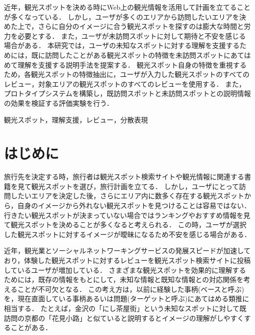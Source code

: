 \documentclass{deimj}
\begin{document}
\pagestyle{empty}
\begin{jabstract}
近年，観光スポットを決める時にWeb上の観光情報を活用して計画を立てることが多くなっている．
しかし，ユーザが多くのエリアから訪問したいエリアを決めた上で，さらに自分のイメージに合う観光スポットを探すのは膨大な時間と労力を必要とする．
また，ユーザが未訪問スポットに対して期待と不安を感じる場合がある．
本研究では，ユーザの未知なスポットに対する理解を支援するためには，既に訪問したことがある観光スポットの特徴を未訪問スポットにあてはめて理解を支援する説明手法を提案する．
観光スポット自身の特徴を重視するため，各観光スポットの特徴抽出に，ユーザが入力した観光スポットのすべてのレビュー，対象エリアの観光スポットのすべてのレビューを使用する．
また，プロトタイプシステムを構築し，既訪問スポットと未訪問スポットとの説明情報の効果を検証する評価実験を行う．
\end{jabstract}

\begin{jkeyword}
観光スポット，理解支援，レビュー，分散表現
\end{jkeyword}
\maketitle


\section{はじめに}
\label{sec:はじめに}
旅行先を決定する時，旅行者は観光スポット検索サイトや観光情報に関連する書籍を見て観光スポットを選び，旅行計画を立てる．
しかし，ユーザにとって訪問したいエリアを決定した後，さらにエリア内に数多く存在する観光スポットから，自身のイメージから外れない観光スポットを見つけることは容易ではない．
行きたい観光スポットが決まっていない場合ではランキングやおすすめ情報を見て観光スポットを決めることが多くなると考えられる．
この時，ユーザが選択した観光スポットに対するイメージが曖昧になるため不安を感じる場合がある．

近年，観光業とソーシャルネットワーキングサービスの発展スピードが加速しており，体験した観光スポットに対するレビューを観光スポット検索サイトに投稿しているユーザが増加している．
さまざまな観光スポットを効果的に理解するためには，既存の情報をもとにして，未知な情報と既知な情報との対応関係を考えることが不可欠となる．
この考え方は，以前に経験した事柄(ベースと呼ぶ)を，現在直面している事柄あるいは問題(ターゲットと呼ぶ)にあてはめる類推に相当する．
たとえば，金沢の「にし茶屋街」という未知なスポットに対して既訪問の京都の「花見小路」と似ていると説明するとイメージの理解がしやすくすることがある．
\end{document}
